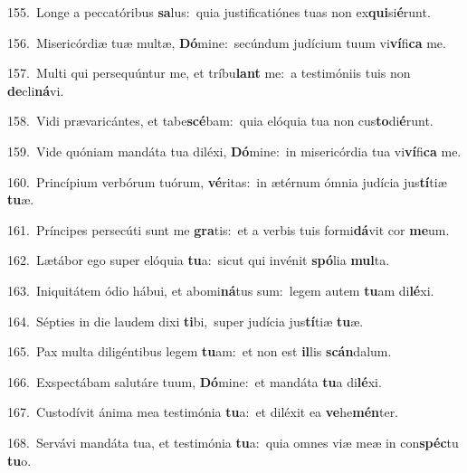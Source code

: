 {\numbfont\textcolor{\numbcolor}{155.}}~Longe a peccatóribus \textbf{sa}\-lus:~\star quia justificatiónes tuas non ex\-\textbf{qui}\-si\-\textbf{é}\-runt.\par
{\numbfont\textcolor{\numbcolor}{156.}}~Misericórdiæ tuæ multæ, \textbf{Dó}\-mine:~\star secúndum judícium tuum vi\-\textbf{ví}\-fi\textbf{ca} me.\par
{\numbfont\textcolor{\numbcolor}{157.}}~Multi qui persequúntur me, et tríbu\textbf{lant} me:~\star a testimóniis tuis non \textbf{de}\-cli\-\textbf{ná}\-vi.\par
{\numbfont\textcolor{\numbcolor}{158.}}~Vidi prævaricántes, et tabe\-\textbf{scé}\-bam:~\star quia elóquia tua non cus\-\textbf{to}\-di\-\textbf{é}\-runt.\par
{\numbfont\textcolor{\numbcolor}{159.}}~Vide quóniam mandáta tua diléxi, \textbf{Dó}\-mine:~\star in misericórdia tua vi\-\textbf{ví}\-fi\textbf{ca} me.\par
{\numbfont\textcolor{\numbcolor}{160.}}~Princípium verbórum tuórum, \textbf{vé}\-ritas:~\star in ætérnum ómnia judícia jus\-\textbf{tí}\-tiæ \textbf{tu}\-æ.\par
{\numbfont\textcolor{\numbcolor}{161.}}~Príncipes persecúti sunt me \textbf{gra}\-tis:~\star et a verbis tuis formi\-\textbf{dá}\-vit cor \textbf{me}\-um.\par
{\numbfont\textcolor{\numbcolor}{162.}}~Lætábor ego super elóquia \textbf{tu}\-a:~\star sicut qui invénit \textbf{spó}\-lia \textbf{mul}\-ta.\par
{\numbfont\textcolor{\numbcolor}{163.}}~Iniquitátem ódio hábui, et abomi\-\textbf{ná}\-tus sum:~\star legem autem \textbf{tu}\-am di\-\textbf{lé}\-xi.\par
{\numbfont\textcolor{\numbcolor}{164.}}~Sépties in die laudem dixi \textbf{ti}\-bi,~\star super judícia jus\-\textbf{tí}\-tiæ \textbf{tu}\-æ.\par
{\numbfont\textcolor{\numbcolor}{165.}}~Pax multa diligéntibus legem \textbf{tu}\-am:~\star et non est \textbf{il}\-lis \textbf{scán}\-dalum.\par
{\numbfont\textcolor{\numbcolor}{166.}}~Exspectábam salutáre tuum, \textbf{Dó}\-mine:~\star et mandáta \textbf{tu}\-a di\-\textbf{lé}\-xi.\par
{\numbfont\textcolor{\numbcolor}{167.}}~Custodívit ánima mea testimónia \textbf{tu}\-a:~\star et diléxit ea \textbf{ve}\-he\-\textbf{mén}\-ter.\par
{\numbfont\textcolor{\numbcolor}{168.}}~Servávi mandáta tua, et testimónia \textbf{tu}\-a:~\star quia omnes viæ meæ in con\-\textbf{spéc}\-tu \textbf{tu}\-o.\par
